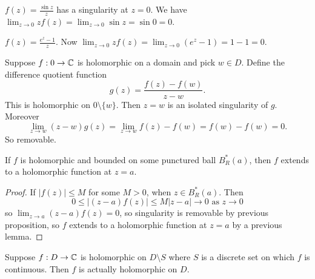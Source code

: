 \documentclass[10pt, a4paper]{article}
\begin{document}
\begin{example}
    $f(z) = \frac{\sin{z}}{z}$ has a singularity at $z = 0$.
    We have $\lim_{z \to 0}zf(z) = \lim_{z \to 0}\sin{z} = \sin{0} = 0$.

    $f(z) = \frac{e ^ z - 1}{z}$.
    Now $\lim_{z \to 0}zf(z) = \lim_{z \to 0}(e ^ z - 1) = 1 - 1 = 0$.
\end{example}

\begin{example}
    Suppose $f : 0 \to \mathbb{C}$ is holomorphic on a domain and pick $w \in D$.
    Define the difference quotient function
    \[
    g(z) = \frac{f(z) - f(w)}{z - w}.
    \]
    This is holomorphic on $0 \setminus \{w\}$.
    Then $z = w$ is an isolated singularity of $g$.
    Moreover
    \[
    \lim_{z \to w}(z - w)g(z) = \lim_{z \to w}f(z) - f(w) = f(w) - f(w) = 0.
    \]
    So removable.
\end{example}

\begin{theorem}
    If $f$ is holomorphic and bounded on some punctured ball $B_{R}^{*}(a)$,
    then $f$ extends to a holomorphic function at $z = a$.

    \begin{proof}
        If $|f(z)| \leq M$ for some $M > 0$,
        when $z \in B_{R}^{*}(a)$.
        Then
        \[
        0 \leq |(z - a)f(z)| \leq M|z - a| \to 0\text{ as } z \to 0
        \]
        so $\lim_{z \to a}(z - a)f(z) = 0$,
        so singularity is removable by previous proposition,
        so $f$ extends to a holomorphic function at $z = a$ by a previous lemma.
    \end{proof}
\end{theorem}

\begin{corollary}
    Suppose $f : D \to \mathbb{C}$ is holomorphic on $D \setminus S$ where $S$ is a discrete set on which $f$ is continuous.
    Then $f$ is actually holomorphic on $D$.
\end{corollary}
\end{document}
